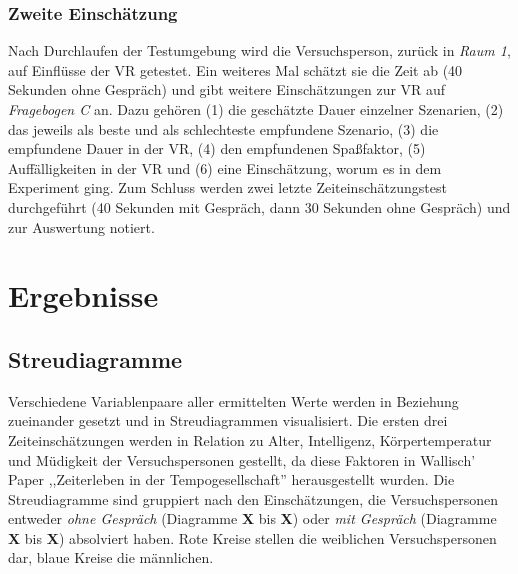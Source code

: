 \documentclass{Paper}
\begin{document}
\subsubsection{Zweite Einschätzung}

Nach Durchlaufen der Testumgebung wird die Versuchsperson, zurück in \textit{Raum 1}, auf Einflüsse der VR getestet. Ein weiteres Mal schätzt sie die Zeit ab (40 Sekunden ohne Gespräch) und gibt weitere Einschätzungen zur VR auf \textit{Fragebogen C} an. Dazu gehören (1) die geschätzte Dauer einzelner Szenarien, (2) das jeweils als beste und als schlechteste empfundene Szenario, (3)  die empfundene Dauer in der VR, (4) den empfundenen Spaßfaktor, (5) Auffälligkeiten in der VR und (6) eine Einschätzung, worum es in dem Experiment ging.
Zum Schluss werden zwei letzte Zeiteinschätzungstest durchgeführt (40 Sekunden mit Gespräch, dann 30 Sekunden ohne Gespräch) und zur Auswertung notiert.



\section{Ergebnisse}
	\subsection{Streudiagramme}

Verschiedene Variablenpaare aller ermittelten Werte werden in Beziehung zueinander gesetzt und in Streudiagrammen visualisiert. Die ersten drei Zeiteinschätzungen werden in Relation zu Alter, Intelligenz, Körpertemperatur und Müdigkeit der Versuchspersonen gestellt, da diese Faktoren in Wallisch' Paper ,,Zeiterleben in der Tempogesellschaft'' herausgestellt wurden. \cite{Wallisch2003}
Die Streudiagramme sind gruppiert nach den Einschätzungen, die Versuchspersonen entweder \textit{ohne Gespräch} (Diagramme \textbf{X} bis \textbf{X}) oder \textit{mit Gespräch} (Diagramme \textbf{X} bis \textbf{X}) absolviert haben.
Rote Kreise stellen die weiblichen Versuchspersonen dar, blaue Kreise die männlichen.

\end{document}
